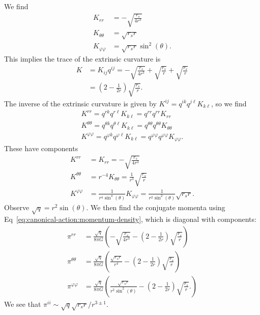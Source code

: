 We find
\begin{subequations}
\begin{align}
K_{rr} &= -\sqrt{\frac{r_{s}}{4r^{3}}}\\
K_{\theta\theta} &= \sqrt{r_{s}r}\\
K_{\varphi\varphi} &= \sqrt{r_{s}r}\sin^{2}(\theta).
\end{align}
\end{subequations}
This implies the trace of the extrinsic curvature is
\begin{equation}
  \begin{split}
K &= K_{ij}q^{ij} = -\sqrt{\frac{r_{s}}{4r^{3}}} + \sqrt{\frac{r_{s}}{r}} + \sqrt{\frac{r_{s}}{r}}\\
&= \left(2 - \frac{1}{2r}\right)\sqrt{\frac{r_{s}}{r}}.
  \end{split}
\end{equation}
The inverse of the extrinsic curvature is given by
$K^{ij}=q^{ik}q^{j\ell}K_{k\ell}$, so we find
\begin{align*}
K^{rr} = q^{rk}q^{r\ell}K_{k\ell} = q^{rr}q^{rr}K_{rr}\\
K^{\theta\theta}=q^{\theta k}q^{\theta\ell}K_{k\ell} = q^{\theta\theta}q^{\theta\theta}K_{\theta\theta}\\
K^{\varphi\varphi}=q^{\varphi k}q^{\varphi\ell}K_{k\ell} = q^{\varphi\varphi}q^{\varphi\varphi}K_{\varphi\varphi}.
\end{align*}
These have components
\begin{subequations}
\begin{align}
K^{rr} &= K_{rr} = -\sqrt{\frac{r_{s}}{4r^{3}}}\\
K^{\theta\theta} &= r^{-4}K_{\theta\theta} = \frac{1}{r^{3}}\sqrt{\frac{r_{s}}{r}}\\
K^{\varphi\varphi} &= \frac{1}{r^{4}\sin^{4}(\theta)}K_{\varphi\varphi}
= \frac{1}{r^{2}\sin^{2}(\theta)}\sqrt{r_{s}r}.
\end{align}
\end{subequations}
Observe $\sqrt{q}=r^{2}\sin(\theta)$.
We then find the conjugate momenta using
Eq~\eqref{eq:canonical-action:momentum-density}, which is diagonal with components:
\begin{subequations}
\begin{align}
\pi^{rr} &= \frac{\sqrt{q}}{8\pi G}\left(-\sqrt{\frac{r_{s}}{4r^{3}}}-\left(2 - \frac{1}{2r}\right)\sqrt{\frac{r_{s}}{r}}\right)\\
\pi^{\theta\theta} &= \frac{\sqrt{q}}{8\pi G}\left(\frac{\sqrt{r_{s}r}}{r^{4}}-\left(2 - \frac{1}{2r}\right)\sqrt{\frac{r_{s}}{r}}\right)\\
\pi^{\varphi\varphi} &= \frac{\sqrt{q}}{8\pi G}\left(
\frac{\sqrt{r_{s}r}}{r^{2}\sin^{2}(\theta)} - \left(2 - \frac{1}{2r}\right)\sqrt{\frac{r_{s}}{r}}.
\right)
\end{align}
\end{subequations}
We see that $\pi^{ii}\sim\sqrt{q}\sqrt{r_{s}r}/r^{3\pm1}$.